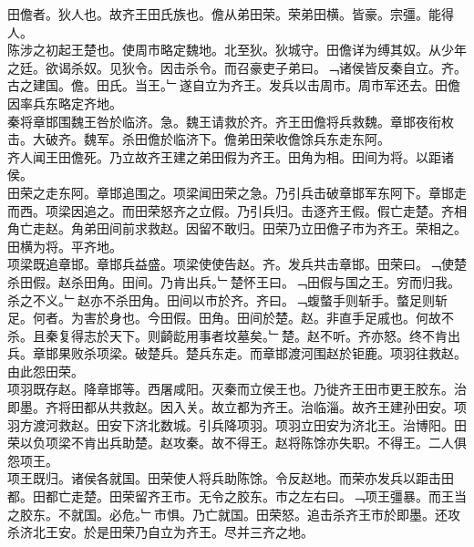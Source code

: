 \documentclass{zhvt-classic}
\begin{document}

\hspace*{2em}田儋者。狄人也。故齐王田氏族也。儋从弟田荣。荣弟田横。皆豪。宗彊。能得人。\\
\hspace*{2em}陈涉之初起王楚也。使周市略定魏地。北至狄。狄城守。田儋详为缚其奴。从少年之廷。欲谒杀奴。见狄令。因击杀令。而召豪吏子弟曰。﹁诸侯皆反秦自立。齐。古之建国。儋。田氏。当王。﹂遂自立为齐王。发兵以击周市。周市军还去。田儋因率兵东略定齐地。\\
\hspace*{2em}秦将章邯围魏王咎於临济。急。魏王请救於齐。齐王田儋将兵救魏。章邯夜衔枚击。大破齐。魏军。杀田儋於临济下。儋弟田荣收儋馀兵东走东阿。\\
\hspace*{2em}齐人闻王田儋死。乃立故齐王建之弟田假为齐王。田角为相。田间为将。以距诸侯。\\
\hspace*{2em}田荣之走东阿。章邯追围之。项梁闻田荣之急。乃引兵击破章邯军东阿下。章邯走而西。项梁因追之。而田荣怒齐之立假。乃引兵归。击逐齐王假。假亡走楚。齐相角亡走赵。角弟田间前求救赵。因留不敢归。田荣乃立田儋子市为齐王。荣相之。田横为将。平齐地。\\
\hspace*{2em}项梁既追章邯。章邯兵益盛。项梁使使告赵。齐。发兵共击章邯。田荣曰。﹁使楚杀田假。赵杀田角。田间。乃肯出兵。﹂楚怀王曰。﹁田假与国之王。穷而归我。杀之不义。﹂赵亦不杀田角。田间以市於齐。齐曰。﹁蝮螫手则斩手。螫足则斩足。何者。为害於身也。今田假。田角。田间於楚。赵。非直手足戚也。何故不杀。且秦复得志於天下。则齮龁用事者坟墓矣。﹂楚。赵不听。齐亦怒。终不肯出兵。章邯果败杀项梁。破楚兵。楚兵东走。而章邯渡河围赵於钜鹿。项羽往救赵。由此怨田荣。\\
\hspace*{2em}项羽既存赵。降章邯等。西屠咸阳。灭秦而立侯王也。乃徙齐王田市更王胶东。治即墨。齐将田都从共救赵。因入关。故立都为齐王。治临淄。故齐王建孙田安。项羽方渡河救赵。田安下济北数城。引兵降项羽。项羽立田安为济北王。治博阳。田荣以负项梁不肯出兵助楚。赵攻秦。故不得王。赵将陈馀亦失职。不得王。二人俱怨项王。\\
\hspace*{2em}项王既归。诸侯各就国。田荣使人将兵助陈馀。令反赵地。而荣亦发兵以距击田都。田都亡走楚。田荣留齐王市。无令之胶东。市之左右曰。﹁项王彊暴。而王当之胶东。不就国。必危。﹂市惧。乃亡就国。田荣怒。追击杀齐王市於即墨。还攻杀济北王安。於是田荣乃自立为齐王。尽并三齐之地。\\
\end{document}
